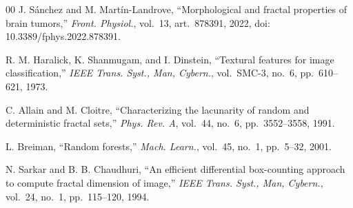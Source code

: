 \documentclass[journal]{IEEEtran}
\begin{document}
\begin{thebibliography}{00}
J. Sánchez and M. Martín-Landrove, ``Morphological and fractal properties of
brain tumors,'' \emph{Front. Physiol.}, vol.~13, art.~878391, 2022,
doi: 10.3389/fphys.2022.878391.

R. M. Haralick, K. Shanmugam, and I. Dinstein, ``Textural features for image
classification,'' \emph{IEEE Trans. Syst., Man, Cybern.}, vol.~SMC-3, no.~6,
pp.~610--621, 1973.

C. Allain and M. Cloitre, ``Characterizing the lacunarity of random and
deterministic fractal sets,'' \emph{Phys. Rev. A}, vol.~44, no.~6,
pp.~3552--3558, 1991.

L. Breiman, ``Random forests,'' \emph{Mach. Learn.}, vol.~45, no.~1, pp.~5--32,
2001.

N. Sarkar and B. B. Chaudhuri, ``An efficient differential box-counting approach
to compute fractal dimension of image,'' \emph{IEEE Trans. Syst., Man, Cybern.},
vol.~24, no.~1, pp.~115--120, 1994.

\end{thebibliography}
\end{document}
